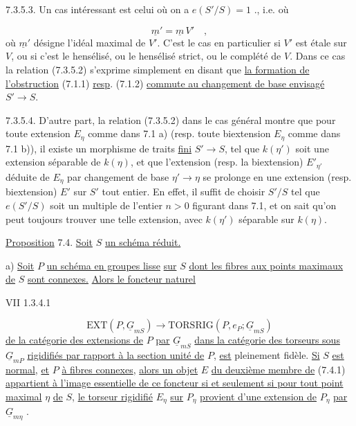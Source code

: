 7.3.5.3. Un cas intéressant est celui où on a $e(S'/S) = 1$ ., i.e. où

\begin{equation*}
\underline{m}' = \underline{m}\, V' \quad ,
\end{equation*}
où $\underline{m}'$ désigne l'idéal maximal de $V'$. C'est le cas en particulier si $V'$ est étale sur $V$, ou si c'est le hensélisé, ou le hensélisé strict, ou le complété de $V$. Dans ce cas la relation (7.3.5.2) s'exprime simplement en disant que \underline{la formation de l'obstruction} (7.1.1) \underline{resp}. (7.1.2) \underline{commute au changement de base envisagé} $S' \longrightarrow S$.

7.3.5.4. D'autre part, la relation (7.3.5.2) dans le cas général montre que pour toute extension $E_\eta$ comme dans 7.1 a) (resp. toute biextension $E_\eta$ comme dans 7.1 b)), il existe un morphisme de traits \underline{fini} $S' \longrightarrow S$,
tel que $k(\eta')$ soit une extension séparable de $k(\eta)$, et que l'extension (resp. la biextension) $E'_{\eta'}$ déduite de $E_{\eta}$ par changement de base $\eta' \longrightarrow \eta$ se prolonge en une extension (resp. biextension) $E'$ sur $S'$ tout entier. En effet, il suffit de choisir $S'/S$ tel que $e(S'/S)$ soit un multiple de l'entier $n > 0$ figurant dans 7.1, et on sait qu'on peut toujours trouver une telle extension, avec $k(\eta')$ séparable sur $k(\eta)$.


\underline{Proposition} 7.4. \underline{Soit} $S$ \underline{un schéma réduit.}

a) \underline{Soit} $P$ \underline{un schéma en groupes lisse} \underline{sur} $S$ \underline{dont les fibres aux points maximaux de} $S$ \underline{sont connexes.} \underline{Alors le foncteur naturel}

VII 1.3.4.1

\begin{equation}\tag{7.4.1}
\mathrm{EXT}(P,\underline{G}_{mS}) \longrightarrow \mathrm{TORSRIG}(P,e_P;\underline{G}_{mS})
\end{equation}
\underline{de la catégorie des extensions de} $P$ \underline{par} $\underline{G}_{mS}$ \underline{dans la catégorie des torseurs sous} $\underline{G}_{mP}$ \underline{rigidifiés par rapport à la section unité de} $P$, \underline{est} pleinement fidèle. \underline{Si} $S$ \underline{est normal}, \underline{et} $P$ \underline{à fibres connexes}, \underline{alors un objet} $E$ \underline{du deuxième membre de} (7.4.1) \underline{appartient à l'image essentielle de ce foncteur si et seulement si pour tout point maximal} $\eta$ \underline{de} $S$, \underline{le torseur rigidifié} $E_{\eta}$ \underline{sur} $P_{\eta}$ \underline{provient d'une extension de} $P_{\eta}$ \underline{par} $\underline{G}_{m\eta}$ .

